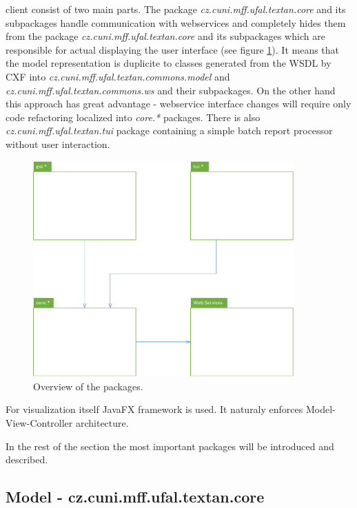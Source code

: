 

\textan{} client consist of two main parts. The package
\emph{cz.cuni.mff.ufal.textan.core} and its subpackages handle communication
with webservices and completely hides them from the package
\emph{cz.cuni.mff.ufal.textan.core} and its subpackages which are responsible
for actual displaying the user interface (see figure \ref{fig:ClientOverview}).
It means that the model representation is duplicite to classes generated from
the WSDL by CXF into \emph{cz.\-cuni.\-mff.\-ufal.\-textan.\-commons.\-model}
and \emph{cz.\-cuni.\-mff.\-ufal.\-textan.\-commons.\-ws} and their subpackages.
On the other hand this approach has great advantage - webservice interface
changes will require only code refactoring localized into \emph{core.*}
packages. There is also \emph{cz.\-cuni.\-mff.\-ufal.\-textan.\-tui} package
containing a simple batch report processor without user interaction.

\begin{figure}[!htb]
        \centering
        \includegraphics[width=10cm]{Images/ClientOverview}
        \caption{Overview of the packages.}
        \label{fig:ClientOverview}
\end{figure}

For visualization itself JavaFX framework is used. It naturaly enforces
Model-View-Controller architecture.

In the rest of the section the most important packages will be introduced and
described.

\subsection{Model - cz.cuni.mff.ufal.textan.core}

